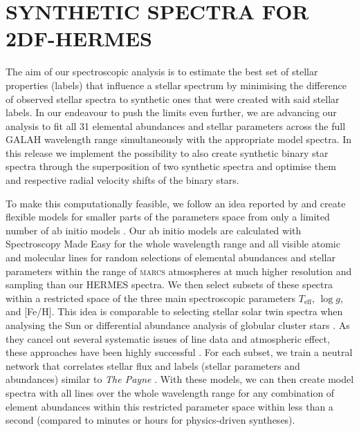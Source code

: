 \documentclass[
  journal=pasa,
  manuscript=research-paper, %
  year=2023,
  volume=37
]{cup-journal}
\newcommand{\Teff}{$T_\mathrm{eff}$\xspace}
\newcommand{\logg}{$\log g$\xspace}
\begin{document}
\section{SYNTHETIC SPECTRA FOR 2DF-HERMES}
\label{sec:synthetic_spectra}

The aim of our spectroscopic analysis is to estimate the best set of stellar properties (labels) that influence a stellar spectrum by minimising the difference of observed stellar spectra to synthetic ones that were created with said stellar labels. In our endeavour to push the limits even further, we are advancing our analysis to fit all 31 elemental abundances and stellar parameters across the full GALAH wavelength range simultaneously with the appropriate model spectra. In this release we implement the possibility to also create synthetic binary star spectra through the superposition of two synthetic spectra and optimise them and respective radial velocity shifts of the binary stars.

To make this computationally feasible, we follow an idea reported by \citet{Rix2016} and create flexible models for smaller parts of the parameters space from only a limited number of ab initio models \citep[see also][]{Ting2016b}. Our ab initio models are calculated with Spectroscopy Made Easy \citep[\textsc{sme}][]{Valenti1996,Piskunov2017} for the whole wavelength range and all visible atomic and molecular lines for random selections of elemental abundances and stellar parameters within the range of \textsc{marcs} atmospheres \citep{Gustafsson2008} at much higher resolution and sampling than our HERMES spectra. We then select subsets of these spectra within a restricted space of the three main spectroscopic parameters \Teff, \logg, and [Fe/H]. This idea is comparable to selecting stellar solar twin spectra when analysing the Sun \citep[see e.g.]{Nissen2015} or differential abundance analysis of globular cluster stars \citep[e.g.][and Monty et al. in prep]{Yong2013}. As they cancel out several systematic issues of line data and atmospheric effect, these approaches have been highly successful \citep{Nissen2018}. For each subset, we train a neutral network that correlates stellar flux and labels (stellar parameters and abundances) similar to \textit{The Payne} \citep{Ting2019}. With these models, we can then create model spectra with all lines over the whole wavelength range for any combination of element abundances within this restricted parameter space within less than a second (compared to minutes or hours for physics-driven syntheses). 
\end{document}
